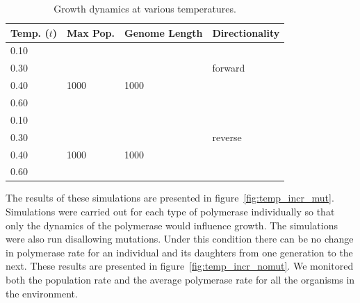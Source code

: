 \begin{table}
	\begin{center}
		\begin{tabular}[c]{ l | l | l | l }
			Temp. ($t$) & Max Pop. & Genome Length & Directionality \\
			\hline
			0.10 & & &\\
			0.30 & & & forward \\
			0.40 & 1000 & 1000 &\\
			0.60 & & &\\
			\hline
			0.10 & & &\\
			0.30 & & & reverse \\
			0.40 & 1000 & 1000 &\\
			0.60 & & &\\
		\end{tabular}
		\caption{Growth dynamics at various temperatures.}
		\label{tab:temp_incr}
	\end{center}
\end{table}

The results of these simulations are presented in figure~\ref{fig:temp_incr_mut}. Simulations were carried out for each type of polymerase individually so that only the dynamics of the polymerase would influence growth. The simulations were also run disallowing mutations. Under this condition there can be no change in polymerase rate for an individual and its daughters from one generation to the next. These results are presented in figure~\ref{fig:temp_incr_nomut}. We monitored both the population rate and the average polymerase rate for all the organisms in the environment.

